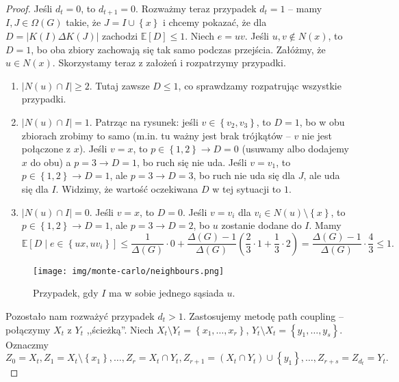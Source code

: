 \begin{proof}
    Jeśli $d_t = 0$, to $d_{t+1}=0$. Rozważmy teraz przypadek $d_t = 1$ -- mamy $I,J \in \Omega\left( G  \right) $ takie, że $J = I \cup \left\{ x  \right\} $ i chcemy pokazać, że dla $D = \left|K\left( I  \right) \Delta K\left( J \right) \right|$ zachodzi $\mathbb{E}\left[ D  \right] \le 1$. Niech $e = uv$. Jeśli $u,v \notin N\left( x  \right) $, to $D = 1$, bo oba zbiory zachowają się tak samo podczas przejścia. Załóżmy, że $u \in N\left( x  \right) $. Skorzystamy teraz z założeń i rozpatrzymy przypadki.
    \begin{enumerate}
        \item $\left|N\left( u  \right) \cap I \right|\ge 2$. Tutaj zawsze $D \le 1$, co sprawdzamy rozpatrując wszystkie przypadki.
        \item $\left|N\left( u  \right) \cap I \right|= 1$. Patrząc na rysunek: jeśli $v \in \left\{ v_2,v_3 \right\} $, to $D = 1$, bo w obu zbiorach zrobimy to samo (m.in. tu ważny jest brak trójkątów -- $v$ nie jest połączone z $x$). Jeśli $v = x $, to $p \in \left\{ 1,2 \right\}  \to  D=0$ (usuwamy albo dodajemy $x$ do obu) a $p = 3 \to D = 1$, bo ruch się nie uda. Jeśli $v = v_1$, to $p \in \left\{ 1,2 \right\} \to D=1$, ale $p=3 \to D=3$, bo ruch nie uda się dla $J$, ale uda się dla $I$. Widzimy, że wartość oczekiwana  $D$ w tej sytuacji to $1$.
        \item $\left|N\left( u  \right) \cap I \right|=0$. Jeśli $v=x$, to $D=0$. Jeśli $v = v_i$ dla $v_i \in N\left( u  \right) \setminus \left\{ x \right\} $, to $p \in \left\{ 1,2 \right\} \to D=1$, ale $p=3 \to D=2$, bo $u$ zostanie dodane do $I$. Mamy 
    $$\mathbb{E}\left[ D \mid e \in \left\{ ux, uv_i \right\}  \right] \le \frac{1}{\Delta\left( G  \right) }\cdot 0 + \frac{\Delta\left( G  \right) -1}{\Delta\left( G  \right) }\left( \frac{2}{3}\cdot 1 + \frac{1}{3}\cdot 2 \right) = \frac{\Delta\left( G  \right) -1}{\Delta\left( G  \right) }\cdot \frac{4}{3}\le 1.$$
    \end{enumerate}
\begin{figure}[H]
    \centering
    \texttt{[image: img/monte-carlo/neighbours.png]}
    \caption{Przypadek, gdy $I$ ma w sobie jednego sąsiada $u$.}
    \label{fig:path-coupling}
\end{figure}
    Pozostało nam rozważyć przypadek $d_t > 1$. Zastosujemy metodę path coupling -- połączymy $X_t$ z $Y_t$ ,,ścieżką''. Niech $X_t \setminus Y_t = \left\{ x_1,\ldots,x_r \right\} $, $Y_t \setminus X_t = \left\{ y_1,\ldots,y_s \right\} $. Oznaczmy 
    $$Z_0 = X_t, Z_1 = X_t \setminus \left\{ x_1 \right\} ,\ldots, Z_r = X_t \cap Y_t, Z_{r+1} = \left( X_t \cap Y_t \right) \cup \left\{ y_1 \right\} ,\ldots, Z_{r+s} = Z_{d_t} = Y_t .$$

\end{proof}
